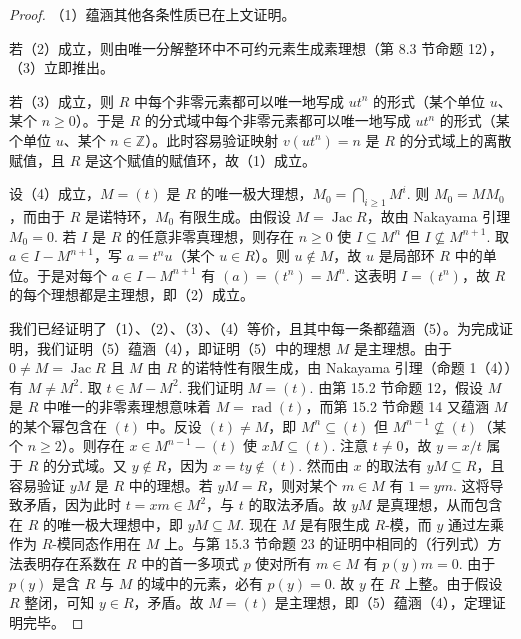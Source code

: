 \begin{proof}
（1）蕴涵其他各条性质已在上文证明。

若（2）成立，则由唯一分解整环中不可约元素生成素理想（第 8.3 节命题 12），（3）立即推出。

若（3）成立，则 \(R\) 中每个非零元素都可以唯一地写成 \(ut^n\) 的形式（某个单位 \(u\)、某个 \(n \geq 0\)）。于是 \(R\) 的分式域中每个非零元素都可以唯一地写成 \(ut^n\) 的形式（某个单位 \(u\)、某个 \(n \in \mathbb{Z}\)）。此时容易验证映射 \(v(ut^n) = n\) 是 \(R\) 的分式域上的离散赋值，且 \(R\) 是这个赋值的赋值环，故（1）成立。

设（4）成立，\(M = (t)\) 是 \(R\) 的唯一极大理想，\(M_0 = \bigcap_{i \geq 1}M^i\). 则 \(M_0 = MM_0\)，而由于 \(R\) 是诺特环，\(M_0\) 有限生成。由假设 \(M = \operatorname{Jac}R\)，故由 Nakayama 引理 \(M_0 = 0\). 若 \(I\) 是 \(R\) 的任意非零真理想，则存在 \(n \geq 0\) 使 \(I \subseteq M^n\) 但 \(I \nsubseteq M^{n+1}\). 取 \(a \in I-M^{n+1}\)，写 \(a = t^nu\)（某个 \(u \in R\)）。则 \(u \notin M\)，故 \(u\) 是局部环 \(R\) 中的单位。于是对每个 \(a \in I-M^{n+1}\) 有 \((a) = (t^n) = M^n\). 这表明 \(I = (t^n)\)，故 \(R\) 的每个理想都是主理想，即（2）成立。

我们已经证明了（1）、（2）、（3）、（4）等价，且其中每一条都蕴涵（5）。为完成证明，我们证明（5）蕴涵（4），即证明（5）中的理想 \(M\) 是主理想。由于 \(0 \neq M = \operatorname{Jac}R\) 且 \(M\) 由 \(R\) 的诺特性有限生成，由 Nakayama 引理（命题 1（4））有 \(M \neq M^2\). 取 \(t \in M-M^2\). 我们证明 \(M = (t)\). 由第 15.2 节命题 12，假设 \(M\) 是 \(R\) 中唯一的非零素理想意味着 \(M = \operatorname{rad}(t)\)，而第 15.2 节命题 14 又蕴涵 \(M\) 的某个幂包含在 \((t)\) 中。反设 \((t) \neq M\)，即 \(M^n \subseteq (t)\) 但 \(M^{n-1} \nsubseteq (t)\)（某个 \(n \geq 2\)）。则存在 \(x \in M^{n-1}-(t)\) 使 \(xM \subseteq (t)\). 注意 \(t \neq 0\)，故 \(y = x/t\) 属于 \(R\) 的分式域。又 \(y \notin R\)，因为 \(x = ty \notin (t)\). 然而由 \(x\) 的取法有 \(yM \subseteq R\)，且容易验证 \(yM\) 是 \(R\) 中的理想。若 \(yM = R\)，则对某个 \(m \in M\) 有 \(1 = ym\). 这将导致矛盾，因为此时 \(t = xm \in M^2\)，与 \(t\) 的取法矛盾。故 \(yM\) 是真理想，从而包含在 \(R\) 的唯一极大理想中，即 \(yM \subseteq M\). 现在 \(M\) 是有限生成 \(R\)-模，而 \(y\) 通过左乘作为 \(R\)-模同态作用在 \(M\) 上。与第 15.3 节命题 23 的证明中相同的（行列式）方法表明存在系数在 \(R\) 中的首一多项式 \(p\) 使对所有 \(m \in M\) 有 \(p(y)m = 0\). 由于 \(p(y)\) 是含 \(R\) 与 \(M\) 的域中的元素，必有 \(p(y) = 0\). 故 \(y\) 在 \(R\) 上整。由于假设 \(R\) 整闭，可知 \(y \in R\)，矛盾。故 \(M = (t)\) 是主理想，即（5）蕴涵（4），定理证明完毕。
\end{proof}

